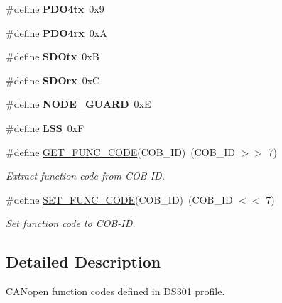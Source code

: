 \begin{DoxyCompactItemize}
\mbox{\label{group___c_a_nopen___function___codes_gabda4cc9ec44d1fc524bfdcae030df4be}} 
\#define {\bfseries P\+D\+O4tx}~0x9
\item 
\mbox{\label{group___c_a_nopen___function___codes_ga282f714f745dd28e9a017044020aa3dc}} 
\#define {\bfseries P\+D\+O4rx}~0xA
\item 
\mbox{\label{group___c_a_nopen___function___codes_ga74331e9b1d102bd0a3d5d9c1fc4f8212}} 
\#define {\bfseries S\+D\+Otx}~0xB
\item 
\mbox{\label{group___c_a_nopen___function___codes_ga44318f0cf5176db0eedd1c8519bd8f35}} 
\#define {\bfseries S\+D\+Orx}~0xC
\item 
\mbox{\label{group___c_a_nopen___function___codes_ga78d5d3f71db9f360c9e3d3953707b0c1}} 
\#define {\bfseries N\+O\+D\+E\+\_\+\+G\+U\+A\+RD}~0xE
\item 
\mbox{\label{group___c_a_nopen___function___codes_gaa09b700d4c6a1eac2a3068f446c397e2}} 
\#define {\bfseries L\+SS}~0xF
\item 
\mbox{\label{group___c_a_nopen___function___codes_gad4585eb139cc908014093ce9b81d0d51}} 
\#define \mbox{\hyperlink{group___c_a_nopen___function___codes_gad4585eb139cc908014093ce9b81d0d51}{G\+E\+T\+\_\+\+F\+U\+N\+C\+\_\+\+C\+O\+DE}}(C\+O\+B\+\_\+\+ID)~(C\+O\+B\+\_\+\+ID $>$$>$ 7)
\begin{DoxyCompactList}\small\item\em Extract function code from C\+O\+B-\/\+ID. \end{DoxyCompactList}\item 
\mbox{\label{group___c_a_nopen___function___codes_gade75ae84ef68190e83a60643194e91fd}} 
\#define \mbox{\hyperlink{group___c_a_nopen___function___codes_gade75ae84ef68190e83a60643194e91fd}{S\+E\+T\+\_\+\+F\+U\+N\+C\+\_\+\+C\+O\+DE}}(C\+O\+B\+\_\+\+ID)~(C\+O\+B\+\_\+\+ID $<$$<$ 7)
\begin{DoxyCompactList}\small\item\em Set function code to C\+O\+B-\/\+ID. \end{DoxyCompactList}\end{DoxyCompactItemize}


\subsection{Detailed Description}
C\+A\+Nopen function codes defined in D\+S301 profile. 